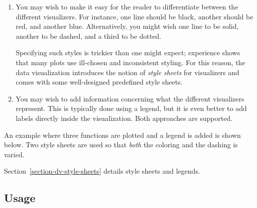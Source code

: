 \begin{enumerate}
\item You may wish to make it easy for the reader to differentiate
  between the different visualizers. For instance, one line should be
  black, another should be red, and another blue. Alternatively, you
  might wish one line to be solid, another to be dashed, and a third
  to be dotted.

  Specifying such styles is trickier than one might expect; experience
  shows that many plots use ill-chosen and inconsistent
  styling. For this reason, the data visualization introduces the
  notion of \emph{style sheets} for visualizers and comes with some
  well-designed predefined style sheets.
\item You may wish to add information concerning what the different
  visualizers represent. This is typically done using a legend, but it
  is even better to add labels directly inside the visualization. Both
  approaches are supported.
\end{enumerate}

An example where three functions are plotted and a legend is added is
shown below. Two style sheets are used so that \emph{both} the
coloring and the dashing is varied.

\begin{codeexample}[]
\end{codeexample}

Section~\ref{section-dv-style-sheets} details style sheets and
legends.


\subsection{Usage}
\label{section-dv-data-syntax}

